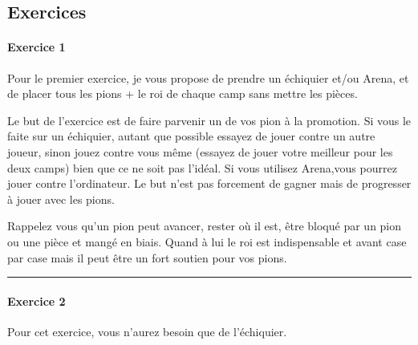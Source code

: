 \documentclass[a5paper,openany,twocolumn]{book}%
\begin{document}

\subsection*{Exercices}

\paragraph*{Exercice 1} 

Pour le premier exercice, je vous propose de prendre un échiquier et/ou Arena, et de placer tous les pions + le roi de chaque camp sans mettre les pièces.

Le but de l'exercice est de faire parvenir un de vos pion à la promotion. Si vous le faite sur un échiquier, autant que possible essayez de jouer contre un autre joueur, sinon jouez contre vous même (essayez de jouer votre meilleur pour les deux camps) bien que ce ne soit pas l'idéal. Si vous utilisez Arena,vous pourrez jouer contre l'ordinateur. Le but n'est pas forcement de gagner mais de progresser à jouer avec les pions.

Rappelez vous qu'un pion peut avancer, rester où il est, être bloqué par un pion ou une pièce et mangé en biais. Quand à lui le roi est indispensable et avant case par case mais il peut être un fort soutien pour vos pions.

\rule{0.4\textwidth}{.4pt}

\paragraph*{Exercice 2} 

Pour cet exercice, vous n'aurez besoin que de l'échiquier. 
\end{document}

